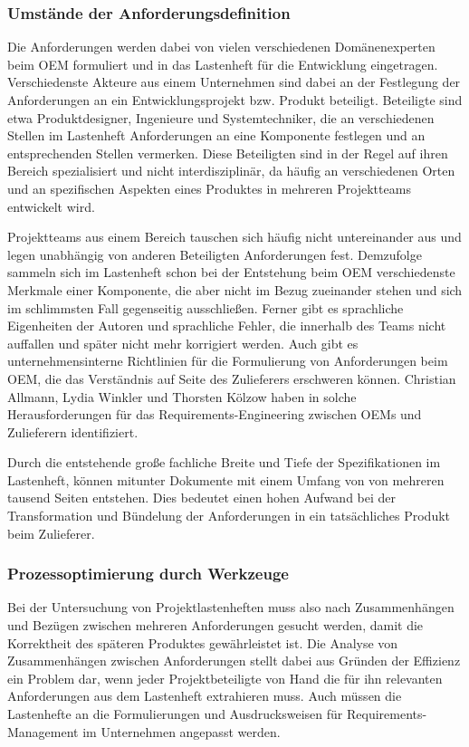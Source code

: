 \documentclass[12pt]{report}
\begin{document}
\subsubsection{Umstände der Anforderungsdefinition}
Die Anforderungen werden dabei von vielen verschiedenen Domänenexperten beim OEM formuliert und in das Lastenheft für die Entwicklung eingetragen. Verschiedenste Akteure aus einem Unternehmen sind dabei an der Festlegung der Anforderungen an ein Entwicklungsprojekt bzw. Produkt beteiligt. Beteiligte sind etwa Produktdesigner, Ingenieure und Systemtechniker, die an verschiedenen Stellen im Lastenheft Anforderungen an eine Komponente festlegen und an entsprechenden Stellen vermerken. Diese Beteiligten sind in der Regel auf ihren Bereich spezialisiert und nicht interdisziplinär, da häufig an verschiedenen Orten und an spezifischen Aspekten eines Produktes in mehreren Projektteams entwickelt wird. 

Projektteams aus einem Bereich tauschen sich häufig nicht untereinander aus und legen unabhängig von anderen Beteiligten Anforderungen fest. Demzufolge sammeln sich im Lastenheft schon bei der Entstehung beim OEM verschiedenste Merkmale einer Komponente, die aber nicht im Bezug zueinander stehen und sich im schlimmsten Fall gegenseitig ausschließen. Ferner gibt es sprachliche Eigenheiten der Autoren und sprachliche Fehler, die innerhalb des Teams nicht auffallen und später nicht mehr korrigiert werden. Auch gibt es unternehmensinterne Richtlinien für die Formulierung von Anforderungen beim OEM, die das Verständnis auf Seite des Zulieferers erschweren können. Christian Allmann, Lydia Winkler und Thorsten Kölzow haben in \cite{awk06} solche Herausforderungen für das Requirements-Engineering zwischen OEMs und Zulieferern identifiziert.

Durch die entstehende große fachliche Breite und Tiefe der Spezifikationen im Lastenheft, können mitunter Dokumente mit einem Umfang von von mehreren tausend Seiten entstehen. Dies bedeutet einen hohen Aufwand bei der Transformation und Bündelung der Anforderungen in ein tatsächliches Produkt beim Zulieferer. 

\subsubsection{Prozessoptimierung durch Werkzeuge}
Bei der Untersuchung von Projektlastenheften muss also nach Zusammenhängen und Bezügen zwischen mehreren Anforderungen gesucht werden, damit die Korrektheit des späteren Produktes gewährleistet ist. Die Analyse von Zusammenhängen zwischen Anforderungen stellt dabei aus Gründen der Effizienz ein Problem dar, wenn jeder Projektbeteiligte von Hand die für ihn relevanten Anforderungen aus dem Lastenheft extrahieren muss. Auch müssen die Lastenhefte an die Formulierungen und Ausdrucksweisen für Requirements-Management im Unternehmen angepasst werden. 
\end{document}
